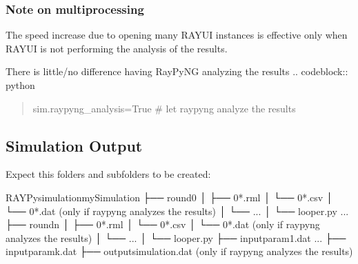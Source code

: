 \documentclass[letterpaper,10pt,english]{sphinxmanual}
\begin{document}
\subsubsection{Note on multiprocessing}
\label{\detokenize{tutorial:note-on-multiprocessing}}
\sphinxAtStartPar
The speed increase due to opening many RAY\sphinxhyphen{}UI instances is effective only when RAY\sphinxhyphen{}UI is not performing the analysis of the results.

\begin{sphinxVerbatim}[commandchars=\\\{\}]
   
\end{sphinxVerbatim}

\sphinxAtStartPar
There is little/no difference having RayPyNG analyzing the results
.. code\sphinxhyphen{}block:: python
\begin{quote}

\sphinxAtStartPar
sim.raypyng\_analysis=True \# let raypyng analyze the results
\end{quote}


\subsection{Simulation Output}
\label{\detokenize{tutorial:simulation-output}}
\sphinxAtStartPar
Expect this folders and subfolders to be created:

\begin{sphinxVerbatim}[commandchars=\\\{\}]
RAYPy\PYGZus{}simulation\PYGZus{}mySimulation
├── round\PYGZus{}0
│   ├── 0\PYGZus{}*.rml
│   └── 0\PYGZus{}*.csv
│   └── 0\PYGZus{}*.dat (only if raypyng analyzes the results)
│   └── ...
│   └── looper.py
...
├── round\PYGZus{}n
│   ├── 0\PYGZus{}*.rml
│   └── 0\PYGZus{}*.csv
│   └── 0\PYGZus{}*.dat (only if raypyng analyzes the results)
│   └── ...
│   └── looper.py
├── input\PYGZus{}param\PYGZus{}1.dat
...
├── input\PYGZus{}param\PYGZus{}k.dat
├── output\PYGZus{}simulation.dat (only if raypyng analyzes the results)
\end{sphinxVerbatim}
\end{document}
